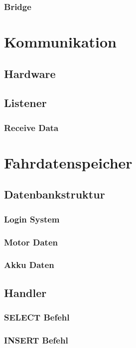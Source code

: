 \subsubsection{Bridge}

\newpage


\section{Kommunikation}
\subsection{Hardware}
\subsection{Listener}
\subsubsection{Receive Data}

\newpage


\section{Fahrdatenspeicher}
\subsection{Datenbankstruktur}
\subsubsection{Login System}
\subsubsection{Motor Daten}
\subsubsection{Akku Daten}
\subsection{Handler}
\subsubsection{SELECT Befehl}
\subsubsection{INSERT Befehl}

\newpage